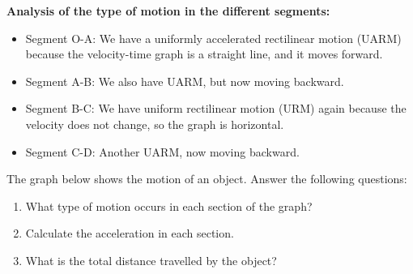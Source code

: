 \textbf{Analysis of the type of motion in the different segments:}

\begin{itemize}
    \item Segment O-A: We have a uniformly accelerated rectilinear motion (UARM) because the velocity-time graph is a straight line, and it moves forward.
    \item Segment A-B: We also have UARM, but now moving backward.
    \item Segment B-C: We have uniform rectilinear motion (URM) again because the velocity does not change, so the graph is horizontal.
    \item Segment C-D: Another UARM, now moving backward.
\end{itemize}


\begin{exercise}
    The graph below shows the motion of an object. Answer the following questions:
    \begin{enumerate}[label=\letraminuscula]
    \item What type of motion occurs in each section of the graph?
    \item Calculate the acceleration in each section.
    \item What is the total distance travelled by the object?
    \end{enumerate}

    \begin{figure}[H]
        \centering
    \end{figure}


\end{exercise}
